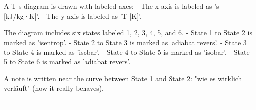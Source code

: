 A T-s diagram is drawn with labeled axes:  
- The x-axis is labeled as 's [kJ/kg·K]'.  
- The y-axis is labeled as 'T [K]'.  

The diagram includes six states labeled 1, 2, 3, 4, 5, and 6.  
- State 1 to State 2 is marked as 'isentrop'.  
- State 2 to State 3 is marked as 'adiabat revers'.  
- State 3 to State 4 is marked as 'isobar'.  
- State 4 to State 5 is marked as 'isobar'.  
- State 5 to State 6 is marked as 'adiabat revers'.  

A note is written near the curve between State 1 and State 2: "wie es wirklich verläuft" (how it really behaves).  

---